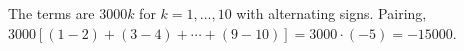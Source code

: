 The terms are $3000k$ for $k=1,\dots,10$ with alternating signs. Pairing, $3000\left[(1-2)+(3-4)+\cdots+(9-10)\right]=3000\cdot(-5)=\boxed{-15000}$.
